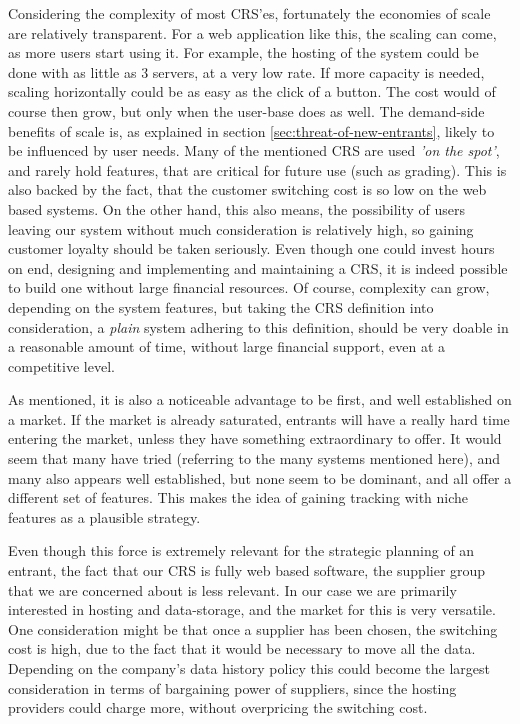 Considering the complexity of most CRS'es, fortunately the economies of scale are relatively transparent. For a web application like this, the scaling can come, as more users start using it. For example, the hosting of the system could be done with as little as 3 servers, at a very low rate. If more capacity is needed, scaling horizontally could be as easy as the click of a button. The cost would of course then grow, but only when the user-base does as well.
The demand-side benefits of scale is, as explained in section \ref{sec:threat-of-new-entrants}, likely to be influenced by user needs. Many of the mentioned CRS are used \emph{'on the spot'}, and rarely hold features, that are critical for future use (such as grading). This is also backed by the fact, that the customer switching cost is so low on the web based systems. On the other hand, this also means, the possibility of users leaving our system without much consideration is relatively high, so gaining customer loyalty should be taken seriously.
Even though one could invest hours on end, designing and implementing and maintaining a CRS, it is indeed possible to build one without large financial resources. Of course, complexity can grow, depending on the system features, but taking the CRS definition into consideration, a \emph{plain} system adhering to this definition, should be very doable in a reasonable amount of time, without large financial support, even at a competitive level.

As mentioned, it is also a noticeable advantage to be first, and well established on a market. If the market is already saturated, entrants will have a really hard time entering the market, unless they have something extraordinary to offer. It would seem that many have tried (referring to the many systems mentioned here), and many also appears well established, but none seem to be dominant, and all offer a different set of features. This makes the idea of gaining tracking with niche features as a plausible strategy.

Even though this force is extremely relevant for the strategic planning of an entrant, the fact that our CRS is fully web based software, the supplier group that we are concerned about is less relevant. In our case we are primarily interested in hosting and data-storage, and the market for this is very versatile. One consideration might be that once a supplier has been chosen, the switching cost is high, due to the fact that it would be necessary to move all the data. Depending on the company's data history policy this could become the largest consideration in terms of bargaining power of suppliers, since the hosting providers could charge more, without overpricing the switching cost.



